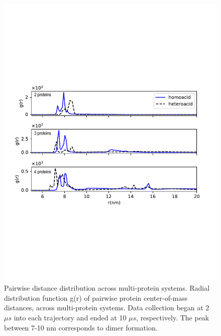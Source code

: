 \begin{figure}[htp]
\includegraphics[width=1.0\linewidth]{figure/figure6.pdf}
\caption[Pairwise distance distribution across multi-protein systems.] {Pairwise distance distribution across multi-protein systems. Radial distribution function g(r)  of pairwise protein center-of-mass distances, across multi-protein systems. Data collection began at 2 $\mu s$ into each trajectory and ended at 10 $\mu s$, respectively. The peak between 7-10 nm corresponds to dimer formation.}
\label{fig:Figure6}
\end{figure}



